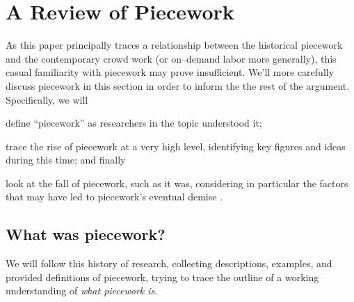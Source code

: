 \documentclass[trackingWork]{subfiles}
\begin{document}
\section{A Review of Piecework}

As this paper principally traces a relationship between
the historical piecework and the contemporary crowd work
(or on--demand labor more generally),
this casual familiarity with piecework may prove insufficient.
We'll more carefully discuss piecework in this section in order
to inform the the rest of the argument.
Specifically, we will
\begin{inlinelist}
  \item define ``piecework'' as researchers in the topic understood it;
  \item trace the rise of piecework at a very high level,
        identifying key figures and ideas during this time; and finally
  \item look at the fall of piecework, such as it was,
        considering in particular
        the factors that may have led to piecework's
        eventual demise .
\end{inlinelist}




\subsection{What was piecework?}

We will follow this history of research, collecting
descriptions,
examples, and
provided definitions of piecework, trying
to trace the outline of a working understanding of
\textit{what piecework is}.
\end{document}
